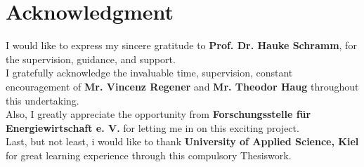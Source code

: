 
\chapter*{\centering Acknowledgment}

\vspace*{4\baselineskip}

\begin{large}
I would like to express my sincere gratitude to \textbf{Prof. Dr. Hauke Schramm}, for the supervision, guidance, and support. \\

I gratefully acknowledge the invaluable time, supervision, constant encouragement of \textbf{Mr. Vincenz Regener} and \textbf{Mr. Theodor Haug} throughout this undertaking. \\


Also, I greatly appreciate the opportunity from \textbf{Forschungsstelle für Energiewirtschaft e. V.} for letting me in on this exciting project.\\

Last, but not least, i would like to thank \textbf{ University of Applied Science, Kiel} for great learning experience 
through this compulsory Thesiswork. \\
\end{large}
	




 